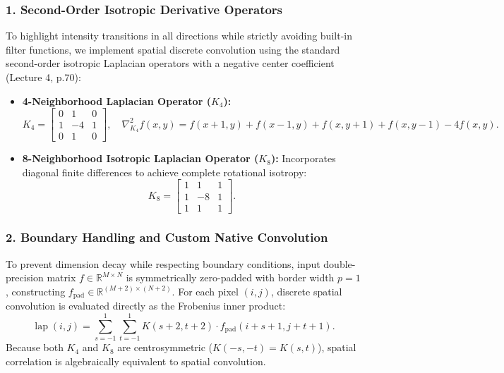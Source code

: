 \documentclass[11pt,a4paper]{article}
\begin{document}
\subsubsection{1. Second-Order Isotropic Derivative Operators}
To highlight intensity transitions in all directions while strictly avoiding built-in filter functions, we implement spatial discrete convolution using the standard second-order isotropic Laplacian operators with a negative center coefficient (Lecture 4, p.70):
\begin{itemize}
    \item \textbf{4-Neighborhood Laplacian Operator ($K_4$):}
    \begin{equation}
    K_4 = \begin{bmatrix} 0 & 1 & 0 \\ 1 & -4 & 1 \\ 0 & 1 & 0 \end{bmatrix}, \quad \nabla_{K_4}^2 f(x, y) = f(x+1, y) + f(x-1, y) + f(x, y+1) + f(x, y-1) - 4f(x, y).
    \end{equation}
    \item \textbf{8-Neighborhood Isotropic Laplacian Operator ($K_8$):} Incorporates diagonal finite differences to achieve complete rotational isotropy:
    \begin{equation}
    K_8 = \begin{bmatrix} 1 & 1 & 1 \\ 1 & -8 & 1 \\ 1 & 1 & 1 \end{bmatrix}.
    \end{equation}
\end{itemize}

\subsubsection{2. Boundary Handling and Custom Native Convolution}
To prevent dimension decay while respecting boundary conditions, input double-precision matrix $f \in \mathbb{R}^{M \times N}$ is symmetrically zero-padded with border width $p=1$, constructing $f_{\text{pad}} \in \mathbb{R}^{(M+2) \times (N+2)}$. For each pixel $(i, j)$, discrete spatial convolution is evaluated directly as the Frobenius inner product:
\begin{equation}
\operatorname{lap}(i, j) = \sum_{s=-1}^1 \sum_{t=-1}^1 K(s+2, t+2) \cdot f_{\text{pad}}(i+s+1, j+t+1).
\end{equation}
Because both $K_4$ and $K_8$ are centrosymmetric ($K(-s, -t) = K(s, t)$), spatial correlation is algebraically equivalent to spatial convolution.
\end{document}
